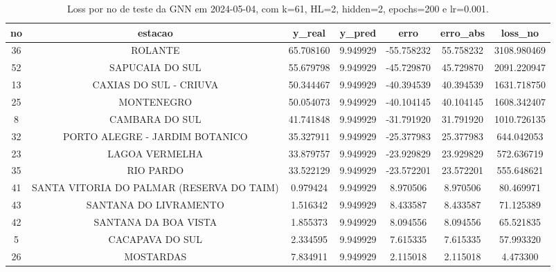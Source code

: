 \begin{table}[h]
\centering
\caption{Loss por no de teste da GNN em 2024-05-04, com k=61, HL=2, hidden=2, epochs=200 e lr=0.001.}
\label{tab:gnn_loss_k61_hl2_h2_e200_d20240504}
\begin{tabular}{ccccccc}
\toprule
no & estacao & y\_real & y\_pred & erro & erro\_abs & loss\_no \\
\midrule
36 & ROLANTE & 65.708160 & 9.949929 & -55.758232 & 55.758232 & 3108.980469 \\
52 & SAPUCAIA DO SUL & 55.679798 & 9.949929 & -45.729870 & 45.729870 & 2091.220947 \\
13 & CAXIAS DO SUL - CRIUVA & 50.344467 & 9.949929 & -40.394539 & 40.394539 & 1631.718750 \\
25 & MONTENEGRO & 50.054073 & 9.949929 & -40.104145 & 40.104145 & 1608.342407 \\
8 & CAMBARA DO SUL & 41.741848 & 9.949929 & -31.791920 & 31.791920 & 1010.726135 \\
32 & PORTO ALEGRE - JARDIM BOTANICO & 35.327911 & 9.949929 & -25.377983 & 25.377983 & 644.042053 \\
23 & LAGOA VERMELHA & 33.879757 & 9.949929 & -23.929829 & 23.929829 & 572.636719 \\
35 & RIO PARDO & 33.522129 & 9.949929 & -23.572201 & 23.572201 & 555.648621 \\
41 & SANTA VITORIA DO PALMAR (RESERVA DO TAIM) & 0.979424 & 9.949929 & 8.970506 & 8.970506 & 80.469971 \\
43 & SANTANA DO LIVRAMENTO & 1.516342 & 9.949929 & 8.433587 & 8.433587 & 71.125389 \\
42 & SANTANA DA BOA VISTA & 1.855373 & 9.949929 & 8.094556 & 8.094556 & 65.521835 \\
5 & CACAPAVA DO SUL & 2.334595 & 9.949929 & 7.615335 & 7.615335 & 57.993320 \\
26 & MOSTARDAS & 7.834911 & 9.949929 & 2.115018 & 2.115018 & 4.473300 \\
\bottomrule
\end{tabular}
\end{table}
